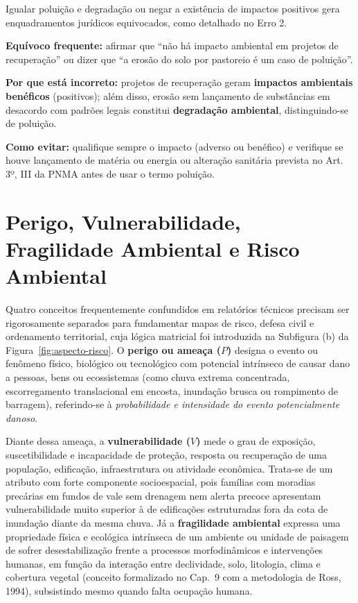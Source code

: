 Igualar poluição e degradação ou negar a existência de impactos positivos gera enquadramentos jurídicos equivocados, como detalhado no Erro 2.

\begin{boxErro}
\textbf{Equívoco frequente:} afirmar que ``não há impacto ambiental em projetos de recuperação'' ou dizer que ``a erosão do solo por pastoreio é um caso de poluição''.

\textbf{Por que está incorreto:} projetos de recuperação geram \textbf{impactos ambientais benéficos} (positivos); além disso, erosão sem lançamento de substâncias em desacordo com padrões legais constitui \textbf{degradação ambiental}, distinguindo-se de poluição.

\textbf{Como evitar:} qualifique sempre o impacto (adverso ou benéfico) e verifique se houve lançamento de matéria ou energia ou alteração sanitária prevista no Art. 3º, III da PNMA antes de usar o termo poluição.
\end{boxErro}

\section{Perigo, Vulnerabilidade, Fragilidade Ambiental e Risco Ambiental}

Quatro conceitos frequentemente confundidos em relatórios técnicos precisam ser rigorosamente separados para fundamentar mapas de risco, defesa civil e ordenamento territorial, cuja lógica matricial foi introduzida na Subfigura (b) da Figura~\ref{fig:aspecto-risco}. O \textbf{perigo ou ameaça ($P$)} designa o evento ou fenômeno físico, biológico ou tecnológico com potencial intrínseco de causar dano a pessoas, bens ou ecossistemas (como chuva extrema concentrada, escorregamento translacional em encosta, inundação brusca ou rompimento de barragem), referindo-se à \textit{probabilidade e intensidade do evento potencialmente danoso}.

Diante dessa ameaça, a \textbf{vulnerabilidade ($V$)} mede o grau de exposição, suscetibilidade e incapacidade de proteção, resposta ou recuperação de uma população, edificação, infraestrutura ou atividade econômica. Trata-se de um atributo com forte componente socioespacial, pois famílias com moradias precárias em fundos de vale sem drenagem nem alerta precoce apresentam vulnerabilidade muito superior à de edificações estruturadas fora da cota de inundação diante da mesma chuva. Já a \textbf{fragilidade ambiental} expressa uma propriedade física e ecológica intrínseca de um ambiente ou unidade de paisagem de sofrer desestabilização frente a processos morfodinâmicos e intervenções humanas, em função da interação entre declividade, solo, litologia, clima e cobertura vegetal (conceito formalizado no Cap.~9 com a metodologia de Ross, 1994), subsistindo mesmo quando falta ocupação humana.

